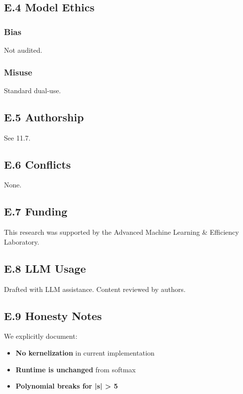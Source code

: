 \subsection{E.4 Model Ethics}

\subsubsection{Bias}
Not audited.

\subsubsection{Misuse}
Standard dual-use.

\subsection{E.5 Authorship}

See  11.7.

\subsection{E.6 Conflicts}

None.

\subsection{E.7 Funding}

This research was supported by the Advanced Machine Learning \& Efficiency Laboratory.

\subsection{E.8 LLM Usage}

Drafted with LLM assistance. Content reviewed by authors.

\subsection{E.9 Honesty Notes}

We explicitly document:
\begin{itemize}
\item \textbf{No kernelization} in current implementation
\item \textbf{Runtime is unchanged} from softmax
\item \textbf{Polynomial breaks for |s| > 5}

\end{itemize}
